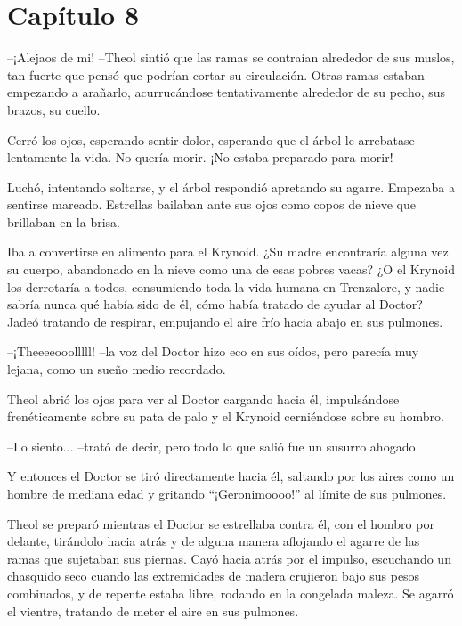 \chapter*{Capítulo 8}

--¡Alejaos de mi! --Theol sintió que las ramas se contraían alrededor de sus muslos, tan fuerte que pensó que podrían cortar su circulación. Otras ramas estaban empezando a arañarlo, acurrucándose tentativamente alrededor de su pecho, sus brazos, su cuello.



Cerró los ojos, esperando sentir dolor, esperando que el árbol le arrebatase lentamente la vida. No quería morir. ¡No estaba preparado para morir!



Luchó, intentando soltarse, y el árbol respondió apretando su agarre. Empezaba a sentirse mareado. Estrellas bailaban ante sus ojos como copos de nieve que brillaban en la brisa.



Iba a convertirse en alimento para el Krynoid. ¿Su madre encontraría alguna vez su cuerpo, abandonado en la nieve como una de esas pobres vacas? ¿O el Krynoid los derrotaría a todos, consumiendo toda la vida humana en Trenzalore, y nadie sabría nunca qué había sido de él, cómo había tratado de ayudar al Doctor? Jadeó tratando de respirar, empujando el aire frío hacia abajo en sus pulmones.



--¡Theeeeooolllll! --la voz del Doctor hizo eco en sus oídos, pero parecía muy lejana, como un sueño medio recordado.



Theol abrió los ojos para ver al Doctor cargando hacia él, impulsándose frenéticamente sobre su pata de palo y el Krynoid cerniéndose sobre su hombro.



--Lo siento... --trató de decir, pero todo lo que salió fue un susurro ahogado.



Y entonces el Doctor se tiró directamente hacia él, saltando por los aires como un hombre de mediana edad y gritando ``¡Geronimoooo!'' al límite de sus pulmones.



Theol se preparó mientras el Doctor se estrellaba contra él, con el hombro por delante, tirándolo hacia atrás y de alguna manera aflojando el agarre de las ramas que sujetaban sus piernas. Cayó hacia atrás por el impulso, escuchando un chasquido seco cuando las extremidades de madera crujieron bajo sus pesos combinados, y de repente estaba libre, rodando en la congelada maleza. Se agarró el vientre, tratando de meter el aire en sus pulmones.



